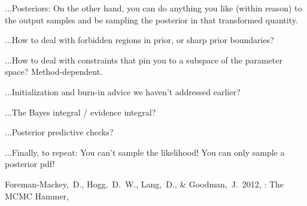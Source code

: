 \documentclass[12pt,twoside,pdftex]{article}
\begin{document}
...Posteriors: On the other hand, you can do anything you like (within
reason) to the output samples and be sampling the posterior in that
transformed quantity.

...How to deal with forbidden regions in prior, or sharp prior boundaries?

...How to deal with constraints that pin you to a subspace of the parameter space?  Method-dependent.

...Initialization and burn-in advice we haven't addressed earlier?

...The Bayes integral / evidence integral?

...Posterior predictive checks?

...Finally, to repeat: You can't sample the likelihood!  You can only
sample a posterior pdf!


\clearpage
{}\theendnotes

\clearpage
\begin{thebibliography}{}
  Foreman-Mackey,~D., Hogg,~D.~W., Lang,~D., \& Goodman,~J.\ 2012,
  : The MCMC Hammer,
\end{thebibliography}
\end{document}
